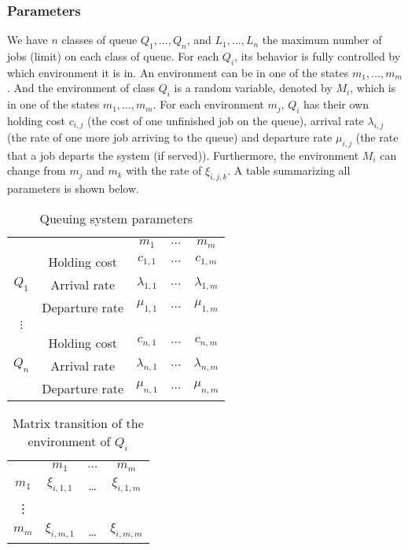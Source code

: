 \documentclass[
  a4paper, xcolor = usenames,dvipsnames]{article}
\theoremstyle{definition}
\theoremstyle{definition}
\theoremstyle{definition}
\theoremstyle{definition}
\theoremstyle{remark}
\begin{document}
\hypertarget{parameters}{%
\subsubsection{Parameters}\label{parameters}}

We have \(n\) classes of queue \(Q_{1}, \dots, Q_{n}\), and \(L_{1}, \dots, L_{n}\) the maximum number of jobs (limit) on each class of queue. For each \(Q_{i}\), its behavior is fully controlled by which environment it is in. An environment can be in one of the states \(m_{1}, \dots, m_{m}\). And the environment of class \(Q_{i}\) is a random variable, denoted by \(M_{i}\), which is in one of the states \(m_{1}, \dots, m_{m}\). For each environment \(m_{j}\), \(Q_{i}\) has their own holding cost \(c_{i, j}\) (the cost of one unfinished job on the queue), arrival rate \(\lambda_{i, j}\) (the rate of one more job arriving to the queue) and departure rate \(\mu_{i, j}\) (the rate that a job departs the system (if served)). Furthermore, the environment \(M_{i}\) can change from \(m_{j}\) and \(m_{k}\) with the rate of \(\xi_{i, j, k}\). A table summarizing all parameters is shown below.

\begin{table}[!htbp]
\caption{Queuing system parameters}
\begin{center}
\begin{tabular}{c c c c c}
    \hline
    \multicolumn{2}{c}{} & $m_{1}$ & $\dots$ & $m_{m}$ \\
    \cline{2-5}
    \multirow{3}{*}{$Q_{1}$} &  Holding cost & $c_{1, 1}$ & $\dots$ & $c_{1, m}$ \\
    & Arrival rate & $\lambda_{1, 1}$ & $\dots$ & $\lambda_{1, m}$ \\
    & Departure rate & $\mu_{1, 1}$ & $\dots$ & $\mu_{1, m}$ \\
    \cline{2-5}
    $\vdots$  \\
    \cline{2-5}
    \multirow{3}{*}{$Q_{n}$} &  Holding cost & $c_{n, 1}$ & $\dots$ & $c_{n, m}$ \\
    & Arrival rate & $\lambda_{n, 1}$ & $\dots$ & $\lambda_{n, m}$ \\
    & Departure rate & $\mu_{n, 1}$ & $\dots$ & $\mu_{n, m}$ \\
    \hline
\end{tabular}
\end{center}
\label{tab:qs-param}
\end{table}

\begin{table}[!htbp]
\caption{Matrix transition of the environment of $Q_{i}$}
\begin{center}
\begin{tabular}{c c c c}
    \hline
    & $m_{1}$ & $\dots$ & $m_{m}$ \\
    $m_{1}$ & $\xi_{i, 1, 1}$ & \dots & $\xi_{i, 1, m}$ \\
    \vdots \\
    $m_{m}$ & $\xi_{i, m, 1}$ & \dots & $\xi_{i, m, m}$ \\
    \hline
\end{tabular}
\end{center}
\label{tab:mat-transition-ci}
\end{table}
\end{document}
